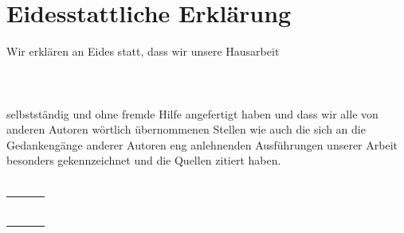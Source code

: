 
\section*{Eidesstattliche Erklärung}

Wir erklären an Eides statt, dass wir unsere Hausarbeit \\ \\
\glqq \titel \grqq{} \\ \\
selbstständig und ohne fremde Hilfe angefertigt haben und dass wir alle von anderen Autoren wörtlich übernommenen Stellen wie auch die sich an die Gedankengänge anderer Autoren eng anlehnenden Ausführungen unserer Arbeit besonders gekennzeichnet und die Quellen zitiert haben.
\\ \\

\begin{tabular}{ p{6cm} p{3cm} p{6cm} }
	& & \\\cline{1-1}\cline{3-3}
	\makebox[6cm]{Ort, Datum} & \makebox[3cm]{} & \makebox[6cm]{Unterschrift} \\
	
	& & \\
	& & \\
	
	& & \\\cline{1-1}\cline{3-3}
	\makebox[6cm]{Ort, Datum} & \makebox[3cm]{} & \makebox[6cm]{Unterschrift}
\end{tabular}